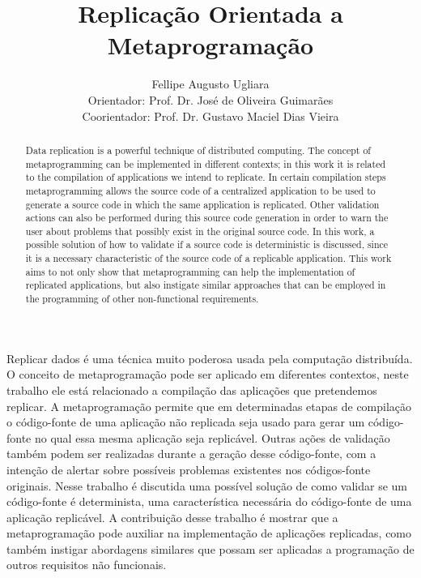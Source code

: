 \documentclass[12pt]{article}
\title{Replicação Orientada a Metaprogramação}
\author{Fellipe Augusto Ugliara\inst{1}\\
	{\normalfont Orientador:} Prof. Dr. José de Oliveira Guimarães\inst{1}\\
	{\normalfont Coorientador:} Prof. Dr. Gustavo Maciel Dias Vieira\inst{1} }
\begin{document}
 

\maketitle

\begin{resumo} 
	Replicar dados é uma técnica muito poderosa usada pela computação
        distribuída. O conceito de metaprogramação pode ser aplicado 
	em diferentes contextos, neste trabalho ele está relacionado a compilação das aplicações 
	que pretendemos replicar. A metaprogramação permite que em determinadas etapas 
	de compilação o código-fonte de uma aplicação não replicada
	seja usado para gerar um código-fonte no qual essa mesma 
	aplicação seja replicável. Outras ações de validação também podem ser 
	realizadas  durante  a  geração   desse  código-fonte,  com  a
        intenção de alertar sobre possíveis 
	problemas existentes nos códigos-fonte originais. Nesse trabalho é discutida 
	uma possível solução de como validar se um código-fonte é determinista, uma 
	característica necessária do código-fonte de uma
	aplicação replicável. A contribuição desse trabalho é mostrar que a 
	metaprogramação pode auxiliar na implementação de aplicações replicadas, 
	como também instigar abordagens similares que possam ser aplicadas a 
	programação de outros requisitos não funcionais.
\end{resumo}


\begin{abstract}
	Data  replication  is  a  powerful  technique  of  distributed
        computing. The concept of metaprogramming can be implemented 
	in different contexts; in this work it is related to the compilation of applications 
	we intend to replicate. In certain compilation steps metaprogramming allows 
	the source code of a centralized application 
	to be used to generate a source code in which the same application is replicated.
	Other validation actions can also be performed during this source code 
	generation in order to warn the user about problems that possibly exist in 
	the original source code. In this work, a possible solution of how to 
	validate if a source code is deterministic is discussed, since it is a necessary 
	characteristic of the source code of a replicable application. 
	This work aims to not only show that metaprogramming can help the implementation 
	of replicated applications, but also instigate similar approaches that can be 
	employed in the programming of other non-functional requirements.
\end{abstract}
\end{document}
